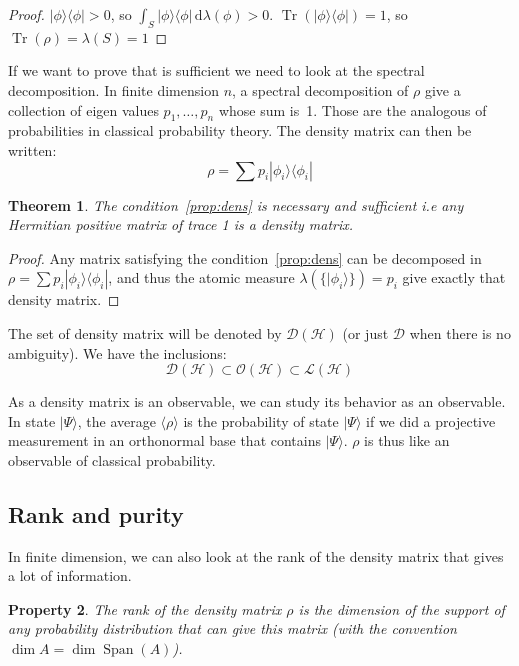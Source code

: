 \documentclass[10pt]{report}
\theoremstyle{plain}
\newtheorem{thm}{Theorem}[chapter]
\newtheorem{prop}[thm]{Property}
\theoremstyle{definition}
\theoremstyle{remark}
\newcommand{\ket}[1]{|#1\rangle}
\newcommand{\bra}[1]{\langle#1|}
\newcommand{\dd}{\mathrm{d}}
\DeclareMathOperator{\Tr}{Tr}
\DeclareMathOperator{\Span}{Span}
\begin{document}
\begin{proof}
  $\ket \phi \bra \phi > 0$, so $ \int_S \ket \phi \bra \phi \,\dd\lambda(\phi)
  > 0$.
  $\Tr(\ket \phi \bra \phi) = 1$, so $\Tr(\rho) = \lambda(S) = 1$
\end{proof}

If we want to prove that is sufficient we need to look at the spectral
decomposition.
In finite dimension $n$, a spectral decomposition of $\rho$ give a
collection of eigen values $p_1, \ldots, p_n$ whose sum is~1. Those are the
analogous of probabilities in classical probability theory. The density matrix
can then be written:
\[\rho = \sum p_i \ket {\phi_i} \bra {\phi_i}\]

\begin{thm} The condition~\ref{prop:dens} is necessary and sufficient i.e any Hermitian positive matrix of trace 1 is a density matrix.
\end{thm}

\begin{proof}
  Any matrix satisfying the condition~\ref{prop:dens} can be decomposed in
  $\rho = \sum p_i \ket {\phi_i} \bra {\phi_i}$, and thus the atomic measure
  $\lambda(\{\ket {\phi_i}\}) = p_i$ give exactly that density matrix.
\end{proof}

The set of density matrix will be denoted by $\mathcal{D}(\mathcal{H})$ (or just
$\mathcal{D}$ when there is no ambiguity). We have the inclusions:
\[\mathcal{D}(\mathcal{H}) \subset \mathcal{O}(\mathcal{H}) \subset \mathcal{L}(\mathcal{H})\]

As a density matrix is an observable, we can study its behavior as an observable.
In state $\ket \Psi$, the average $\langle \rho \rangle$ is the probability of
state $\ket \Psi$ if we did a projective measurement in an orthonormal base that
contains $\ket \Psi$. $\rho$ is thus like an observable of classical probability.

\subsection{Rank and purity}

In finite dimension, we can also look at the
rank of the density matrix that gives a lot of information.

\begin{prop}
  The rank of the density matrix $\rho$ is the dimension of the support of any
  probability distribution that can give this matrix
  (with the convention $\dim A = \dim \Span(A)$).
\end{prop}
\end{document}
